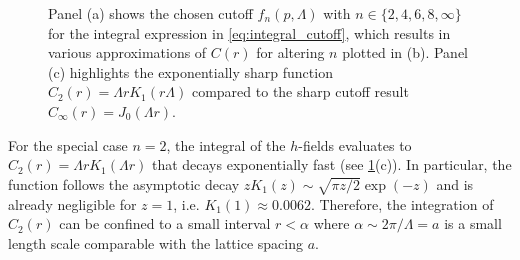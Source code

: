 \documentclass{svmono}
\begin{document}
\begin{figure}
    \caption{Panel (a) shows the chosen cutoff $f_n(p,\Lambda)$ with $n\in\{2,4,6,8,\infty\}$ for the integral expression in \cref{eq:integral_cutoff}, which results in various approximations of $C(r)$ for altering $n$ plotted in (b). Panel (c) highlights the exponentially sharp function $C_2(r)=\Lambda rK_1(r\Lambda)$ compared to the sharp cutoff result $C_\infty(r)=J_0(\Lambda r)$.}
    \label{fig:rg_cutoff}
\end{figure}
For the special case $n=2$, the integral of the $h$-fields evaluates to $C_2(r)=\Lambda r K_1(\Lambda r)$ that decays exponentially fast (see \cref{fig:rg_cutoff}(c)).
In particular, the function follows the asymptotic decay $z K_1(z) \sim \sqrt{\pi z/2}\exp(-z)$ and is already negligible for $z=1$, i.e. $K_1(1)\approx0.0062$.
Therefore, the integration of $C_2(r)$ can be confined to a small interval $r<\alpha$ where $\alpha\sim2\pi/\Lambda=a$ is a small length scale comparable with the lattice spacing $a$.
\end{document}
